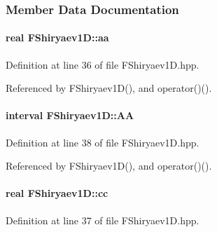 \subsubsection{\-Member \-Data \-Documentation}
\hypertarget{classFShiryaev1D_a6ad03231ef56eaa821a14088c28e5301}{
\paragraph[{aa}]{\setlength{\rightskip}{0pt plus 5cm}real {\bf \-F\-Shiryaev1\-D\-::aa}}}\label{classFShiryaev1D_a6ad03231ef56eaa821a14088c28e5301}


\-Definition at line 36 of file \-F\-Shiryaev1\-D.\-hpp.



\-Referenced by \-F\-Shiryaev1\-D(), and operator()().

\hypertarget{classFShiryaev1D_a66f8360cc03dd1361ceb124fc15c0d91}{
\paragraph[{\-A\-A}]{\setlength{\rightskip}{0pt plus 5cm}interval {\bf \-F\-Shiryaev1\-D\-::\-A\-A}}}\label{classFShiryaev1D_a66f8360cc03dd1361ceb124fc15c0d91}


\-Definition at line 38 of file \-F\-Shiryaev1\-D.\-hpp.



\-Referenced by \-F\-Shiryaev1\-D(), and operator()().

\hypertarget{classFShiryaev1D_a60d3bffaae43ec10e8204ba1bed5f708}{
\paragraph[{cc}]{\setlength{\rightskip}{0pt plus 5cm}real {\bf \-F\-Shiryaev1\-D\-::cc}}}\label{classFShiryaev1D_a60d3bffaae43ec10e8204ba1bed5f708}


\-Definition at line 37 of file \-F\-Shiryaev1\-D.\-hpp.



